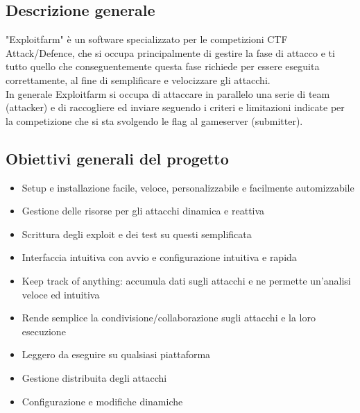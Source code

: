 \documentclass[11pt]{article}
\begin{document}
\subsection{Descrizione generale}
	"Exploitfarm" è un software specializzato per le competizioni CTF Attack/Defence, che si occupa principalmente di gestire la fase di attacco e ti tutto quello che conseguentemente questa fase richiede per essere eseguita correttamente, al fine di semplificare e velocizzare gli attacchi.\\
	In generale Exploitfarm si occupa di attaccare in parallelo una serie di team (attacker) e di raccogliere ed inviare seguendo i criteri e limitazioni indicate per la competizione che si sta svolgendo le flag al gameserver (submitter).
\subsection{Obiettivi generali del progetto}
\begin{itemize}
    \item Setup e installazione facile, veloce, personalizzabile e facilmente automizzabile
    \item Gestione delle risorse per gli attacchi dinamica e reattiva
    \item Scrittura degli exploit e dei test su questi semplificata
    \item Interfaccia intuitiva con avvio e configurazione intuitiva e rapida
    \item Keep track of anything: accumula dati sugli attacchi e ne permette un'analisi veloce ed intuitiva
    \item Rende semplice la condivisione/collaborazione sugli attacchi e la loro esecuzione
    \item Leggero da eseguire su qualsiasi piattaforma
    \item Gestione distribuita degli attacchi
    \item Configurazione e modifiche dinamiche
\end{itemize}
\end{document}
